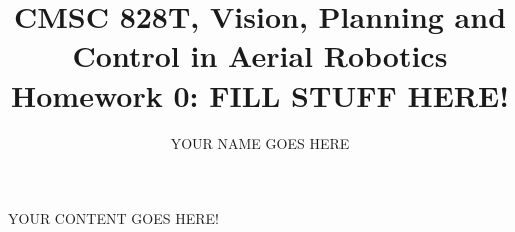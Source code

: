 \documentclass[english, 12pt]{article}
\title{CMSC 828T, Vision, Planning and Control in Aerial Robotics \\
Homework 0: FILL STUFF HERE!}
\author{YOUR NAME GOES HERE}
\begin{document}
\maketitle

YOUR CONTENT GOES HERE!



%
%
\end{document}
